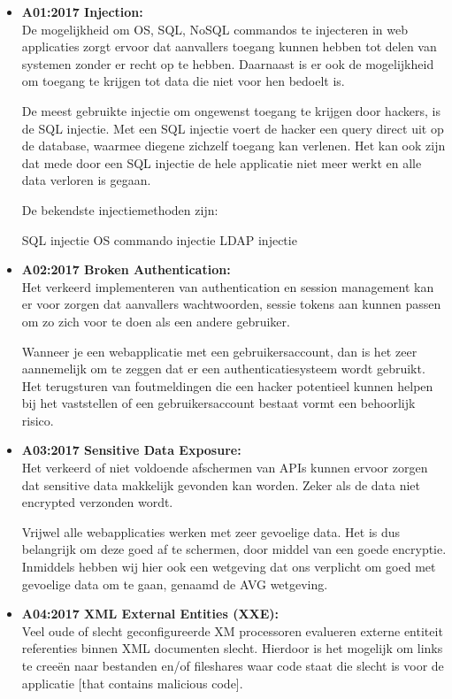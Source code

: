 \begin{itemize}

[Bron: https://codebros.nl/blog/wat-is-de-owasp-top-10 , https://owasp.org/www-project-top-ten/ << PDF download]
\item \textbf{A01:2017 Injection:} \\De mogelijkheid om OS, SQL, NoSQL commandos te injecteren in web applicaties zorgt ervoor dat aanvallers toegang kunnen hebben tot delen van systemen zonder er recht op te hebben. Daarnaast is er ook de mogelijkheid om toegang te krijgen tot data die niet voor hen bedoelt is.

De meest gebruikte injectie om ongewenst toegang te krijgen door hackers, is de SQL injectie. Met een SQL injectie voert de hacker een query direct uit op de database, waarmee diegene zichzelf toegang kan verlenen. Het kan ook zijn dat mede door een SQL injectie de hele applicatie niet meer werkt en alle data verloren is gegaan.

De bekendste injectiemethoden zijn:

    SQL injectie
    OS commando injectie
    LDAP injectie
\item \textbf{A02:2017 Broken Authentication:}\\ Het verkeerd implementeren van authentication en session management kan er voor zorgen dat aanvallers wachtwoorden, sessie tokens aan kunnen passen om zo zich voor te doen als een andere gebruiker.

Wanneer je een webapplicatie met een gebruikersaccount, dan is het zeer aannemelijk om te zeggen dat er een authenticatiesysteem wordt gebruikt. Het terugsturen van foutmeldingen die een hacker potentieel kunnen helpen bij het vaststellen of een gebruikersaccount bestaat vormt een behoorlijk risico.


\item \textbf{A03:2017 Sensitive Data Exposure:}\\
Het verkeerd of niet voldoende afschermen van APIs kunnen ervoor zorgen dat sensitive data makkelijk gevonden kan worden. Zeker als de data niet encrypted verzonden wordt.

Vrijwel alle webapplicaties werken met zeer gevoelige data. Het is dus belangrijk om deze goed af te schermen, door middel van een goede encryptie. Inmiddels hebben wij hier ook een wetgeving dat ons verplicht om goed met gevoelige data om te gaan, genaamd de AVG wetgeving.


\item \textbf{A04:2017 XML External Entities (XXE):}\\
Veel oude of slecht geconfigureerde XM processoren evalueren externe entiteit referenties binnen XML documenten slecht. Hierdoor is het mogelijk om links te cree\"en naar bestanden en/of fileshares waar code staat die slecht is voor de applicatie [that contains malicious code].


\end{itemize}
